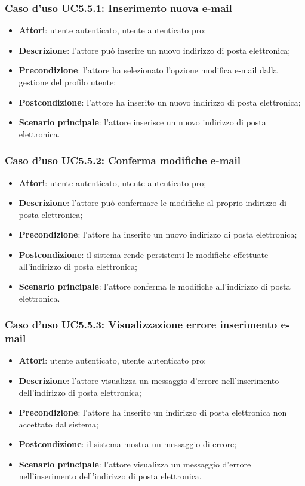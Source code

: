 \subsubsection{Caso d'uso UC5.5.1: Inserimento nuova e-mail}

\begin{itemize}
	\item \textbf{Attori}: utente autenticato, utente autenticato pro;
	\item \textbf{Descrizione}: l'attore può inserire un nuovo indirizzo di posta elettronica;
	\item \textbf{Precondizione}:  l'attore ha selezionato l'opzione modifica e-mail dalla gestione del profilo utente;
	\item \textbf{Postcondizione}: l'attore ha inserito un nuovo indirizzo di posta elettronica;
	\item \textbf{Scenario principale}: l'attore inserisce un nuovo indirizzo di posta elettronica.
\end{itemize}

\subsubsection{Caso d'uso UC5.5.2: Conferma modifiche e-mail}

\begin{itemize}
	\item \textbf{Attori}: utente autenticato, utente autenticato pro;
	\item \textbf{Descrizione}: l'attore può confermare le modifiche al proprio indirizzo di posta elettronica;
	\item \textbf{Precondizione}: l'attore ha inserito un nuovo indirizzo di posta elettronica;
	\item \textbf{Postcondizione}: il sistema rende persistenti le modifiche effettuate all'indirizzo di posta elettronica;
	\item \textbf{Scenario principale}: l'attore conferma le modifiche all'indirizzo di posta elettronica.
\end{itemize}

 \subsubsection{Caso d'uso UC5.5.3: Visualizzazione errore inserimento e-mail}
 \begin{itemize}
 	\item \textbf{Attori}: utente autenticato, utente autenticato pro;
 	\item \textbf{Descrizione}: l'attore visualizza un messaggio d'errore nell'inserimento dell'indirizzo di posta elettronica;
 	\item \textbf{Precondizione}: l'attore ha inserito un indirizzo di posta elettronica non accettato dal sistema;
 	\item \textbf{Postcondizione}: il sistema mostra un messaggio di errore;
 	\item \textbf{Scenario principale}: l'attore visualizza un messaggio d'errore nell'inserimento dell'indirizzo di posta elettronica.
 \end{itemize}

